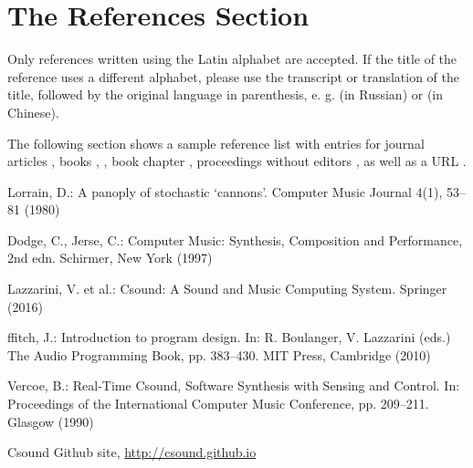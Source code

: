 \documentclass[runningheads,a4paper]{llncs}
\begin{document}
\section{The References Section}\label{references}

Only references written using the Latin alphabet are accepted. If the title of
the reference uses a different alphabet, please use the transcript or
translation of the title, followed by the original language in parenthesis, e.
g. (in Russian) or (in Chinese).

The following section shows a sample reference list with entries for
journal articles \cite{jour}, books \cite{book1}, \cite{book2}, book chapter
\cite{chapter}, proceedings without editors \cite{proceeding}, as well as a
URL \cite{url}.

\begin{thebibliography}{4}

 Lorrain, D.: A panoply of stochastic `cannons'. Computer Music Journal 4(1), 53--81 (1980)

 Dodge, C., Jerse, C.: Computer Music: Synthesis, Composition and 
Performance, 2nd edn. Schirmer, New York (1997)

 Lazzarini, V. et al.: Csound: A Sound and Music Computing System.
Springer (2016)

 ffitch, J.: Introduction to program design. In: R. Boulanger,
V. Lazzarini (eds.) The Audio Programming Book, pp. 383--430.
MIT Press, Cambridge (2010)

 Vercoe, B.: Real-Time Csound, Software Synthesis with
Sensing and Control. In: Proceedings of the International Computer Music
Conference, pp. 209--211. Glasgow (1990)

 Csound Github site, \url{http://csound.github.io}


\end{thebibliography}
\end{document}
